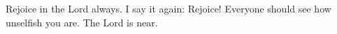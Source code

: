 
\lettrine{R}{}ejoice in the Lord always. I say it again: Rejoice! Everyone should see how unselfish you are. The Lord is near.